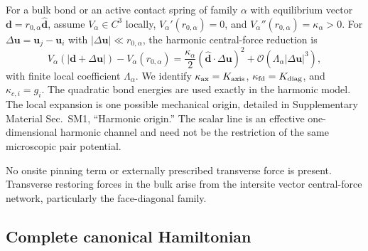 \documentclass[10pt,aps,onecolumn,floatfix,notitlepage,nofootinbib,showkeys]{revtex4-2}
\newcommand{\vu}{\bm{u}}
\newcommand{\vd}{\bm{d}}
\newcommand{\order}{\mathcal O}
\begin{document}
For a bulk bond or an active contact spring of family $\alpha$ with equilibrium vector $\vd=r_{0,\alpha}\hat{\vd}$, assume $V_\alpha\in C^3$ locally, $V_\alpha'(r_{0,\alpha})=0$, and $V_\alpha''(r_{0,\alpha})=\kappa_\alpha>0$. For $\Delta\vu=\vu_j-\vu_i$ with $|\Delta\vu|\ll r_{0,\alpha}$, the harmonic central-force reduction is~\cite{BornHuang1954,Maradudin1971}
\begin{equation}
  V_\alpha(|\vd+\Delta\vu|)-V_\alpha(r_{0,\alpha})
  =\frac{\kappa_\alpha}{2}(\hat{\vd}\cdot\Delta\vu)^2
  +\order(\Lambda_\alpha|\Delta\vu|^3),
  \label{eq:s2-energy-expansion}
\end{equation}
with finite local coefficient $\Lambda_\alpha$. We identify $\kappa_{\rm ax}=K_{\rm axis}$, $\kappa_{\rm fd}=K_{\rm diag}$, and $\kappa_{c,i}=g_i$. The quadratic bond energies are used exactly in the harmonic model. The local expansion is one possible mechanical origin, detailed in Supplementary Material Sec.~SM1, ``Harmonic origin.'' The scalar line is an effective one-dimensional harmonic channel and need not be the restriction of the same microscopic pair potential.

No onsite pinning term or externally prescribed transverse force is present. Transverse restoring forces in the bulk arise from the intersite vector central-force network, particularly the face-diagonal family.

\subsection{Complete canonical Hamiltonian}
\label{sec:s2-hamiltonian}
\end{document}
